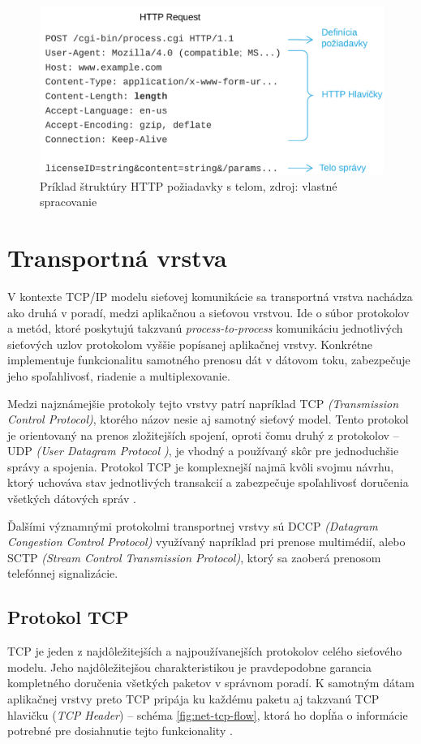\documentclass[
  digital, %
  oneside, %
  table,   %
  lof,     %
  nolot,   %
  nocover
]{fithesis3}
\begin{document}
\begin{figure}[h]
  \centering
    \includegraphics[width=.97\textwidth]{images/net-http.png}
  \caption{Príklad štruktúry HTTP požiadavky s telom, zdroj: vlastné spracovanie}
  \label{fig:net-http}
\end{figure}

\section{Transportná vrstva}
V kontexte TCP/IP modelu sieťovej komunikácie sa transportná vrstva nachádza
ako druhá v poradí, medzi aplikačnou a sieťovou vrstvou. Ide o súbor protokolov
a metód, ktoré poskytujú takzvanú \textit{process-to-process} komunikáciu
jednotlivých sieťových uzlov protokolom vyššie popísanej aplikačnej vrstvy.
Konkrétne implementuje funkcionalitu samotného prenosu dát v dátovom toku,
zabezpečuje jeho spoľahlivosť, riadenie a multiplexovanie. 

Medzi najznámejšie protokoly tejto vrstvy patrí napríklad TCP
\textit{(Transmission Control Protocol)}, ktorého názov nesie aj samotný
sieťový model. Tento protokol je orientovaný na prenos zložitejších spojení,
oproti čomu druhý z protokolov -- UDP \textit{(User Datagram Protocol )}, je
vhodný a používaný skôr pre jednoduchšie správy a spojenia. Protokol TCP je
komplexnejší najmä kvôli svojmu návrhu, ktorý uchováva stav jednotlivých
transakcií a zabezpečuje spoľahlivosť doručenia všetkých dátových správ \cite{rfc1122}. 

Ďalšími
významnými protokolmi transportnej vrstvy sú DCCP
\textit{(Datagram Congestion Control Protocol)} využívaný napríklad pri prenose
multimédií, alebo SCTP \textit{(Stream Control Transmission Protocol)}, ktorý
sa zaoberá prenosom telefónnej signalizácie.

\subsection{Protokol TCP}
TCP je jeden z najdôležitejších a najpoužívanejších protokolov celého sieťového
modelu. Jeho najdôležitejšou charakteristikou je
pravdepodobne garancia kompletného doručenia všetkých paketov v správnom
poradí. K samotným dátam aplikačnej vrstvy preto TCP pripája ku každému paketu
aj takzvanú TCP hlavičku (\textit{TCP Header}) -- schéma \ref{fig:net-tcp-flow}, ktorá ho dopĺňa o informácie
potrebné pre dosiahnutie tejto funkcionality \cite{FIDIS:TCP}.
\end{document}
